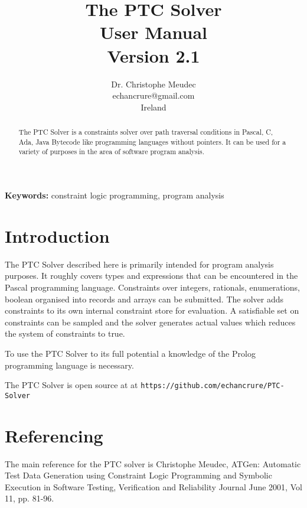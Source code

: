 \documentclass{article}
\begin{document}
\title{The PTC Solver\\
       User Manual\\
       Version 2.1}
\author{Dr. Christophe Meudec \\
        echancrure@gmail.com \\
        Ireland}
\maketitle

\begin{abstract}
The PTC Solver is a constraints solver over path traversal conditions in Pascal,
C, Ada, Java Bytecode like programming languages without pointers. It
can be used for a variety of purposes in the area of software program analysis.
\end{abstract}


\noindent\textbf{Keywords:} constraint logic programming, program analysis

\section{Introduction}

The PTC Solver described here is primarily intended for program analysis
purposes.
It roughly covers types and expressions that can be encountered in the Pascal
programming language. Constraints over integers, rationals,
enumerations, boolean organised into records and arrays can be submitted. The
solver adds constraints to its own internal constraint store for evaluation. A
satisfiable set on constraints can be sampled and the solver generates actual
values which reduces the system of constraints to true.

To use the PTC Solver to its full potential a knowledge of the Prolog programming language is necessary.

The PTC Solver is open source at at \texttt{https://github.com/echancrure/PTC-Solver}

\section{Referencing}

The main reference for the PTC solver is Christophe Meudec,
ATGen: Automatic Test Data Generation using Constraint Logic Programming and
Symbolic Execution
in Software Testing, Verification and Reliability Journal
June 2001, Vol 11, pp. 81-96.
\end{document}
